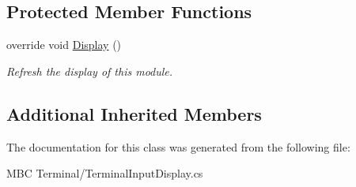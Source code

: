 \subsection*{Protected Member Functions}
\begin{DoxyCompactItemize}
\item 
\hypertarget{class_m_b_c_1_1_terminal_1_1_terminal_input_display_ad53f148aeaa7faa46910c4f6062cd496}{override void \hyperlink{class_m_b_c_1_1_terminal_1_1_terminal_input_display_ad53f148aeaa7faa46910c4f6062cd496}{Display} ()}\label{class_m_b_c_1_1_terminal_1_1_terminal_input_display_ad53f148aeaa7faa46910c4f6062cd496}

\begin{DoxyCompactList}\small\item\em Refresh the display of this module.\end{DoxyCompactList}\end{DoxyCompactItemize}
\subsection*{Additional Inherited Members}


The documentation for this class was generated from the following file\-:\begin{DoxyCompactItemize}
\item 
M\-B\-C Terminal/Terminal\-Input\-Display.\-cs\end{DoxyCompactItemize}
